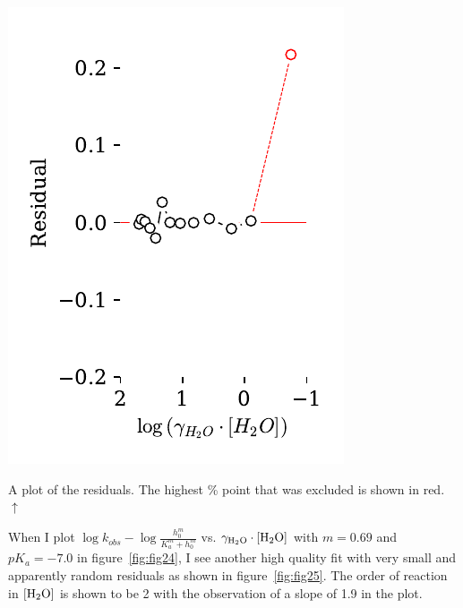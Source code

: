 \documentclass[]{tufte-handout}
\begin{document}
\begin{marginfigure}[-40mm]
  \centering
  \includegraphics[scale=0.7]{images/fig24r}
  \caption{A plot of the residuals. The highest \% point that was excluded is shown in red. $\uparrow$} 
  \label{fig:fig25}
\end{marginfigure}

When I plot $\log{k_{obs}}-\log{\frac{h_0^m}{K_a^m + h_0^m}}$ vs. $\gamma_{\ce{H2O}} \cdot [\ce{H2O}]$ with $m = 0.69$ and $pK_a = -7.0$ in figure~\ref{fig:fig24}, I see another high quality fit with very small and apparently random residuals as shown in figure~\ref{fig:fig25}. The order of reaction in $[\ce{H2O}]$ is shown to be 2 with the observation of a slope of 1.9 in the plot.
\end{document}
